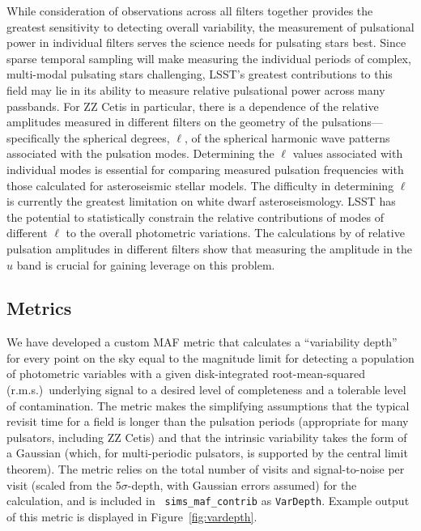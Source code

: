 While consideration of observations across all filters together provides
the greatest sensitivity to detecting overall variability, the measurement
of pulsational power in individual filters serves the science needs for
pulsating stars best.  Since sparse temporal sampling will make measuring
the individual periods of complex, multi-modal pulsating stars challenging,
LSST's greatest contributions to this field may lie
in its ability to measure relative pulsational power across many
passbands.  For ZZ Cetis in particular, there is a dependence of
the relative amplitudes measured in different filters on the geometry of
the pulsations---specifically the spherical degrees, $\ell$, of the
spherical harmonic wave patterns associated with the pulsation modes.
Determining the $\ell$ values associated with individual modes is
essential for comparing measured pulsation frequencies with those
calculated for asteroseismic stellar models.  The difficulty in
determining $\ell$ is currently the greatest limitation on white dwarf
asteroseismology. LSST has the potential to statistically constrain the
relative contributions of modes of different $\ell$ to the
overall photometric variations.  The calculations by
\citet{1995ApJS...96..545B} of relative pulsation amplitudes in
different filters show that measuring the amplitude in the $u$ band is
crucial for gaining leverage on this problem.


\subsection{Metrics}
\label{sec:\secname:metrics}

We have developed a custom MAF metric that calculates a ``variability
depth'' for every point on the sky equal to the magnitude limit for
detecting a population of photometric variables with a given
disk-integrated root-mean-squared (r.m.s.)\ underlying signal to a
desired level of completeness and a tolerable level of contamination.
The metric makes the simplifying
assumptions that the typical revisit time for a field is longer than the
pulsation periods (appropriate for many pulsators, including ZZ Cetis)
and that the intrinsic variability takes the form of a Gaussian (which,
for multi-periodic pulsators, is supported by the central limit
theorem).  The metric relies on the total number of visits and
signal-to-noise per visit (scaled from the 5$\sigma$-depth, with
Gaussian errors assumed) for the calculation, and is included in {\tt
sims\_maf\_contrib} as {\tt VarDepth}.  Example output of this metric
is displayed in Figure~\ref{fig:vardepth}.

